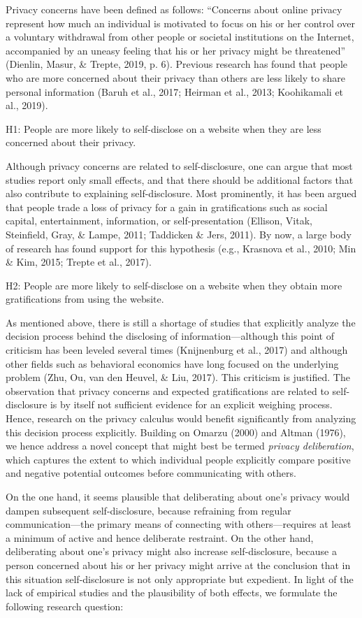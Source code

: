 \documentclass[
  english,
  man,floatsintext]{apa6}
\begin{document}
Privacy concerns have been defined as follows:
\enquote{Concerns about online privacy represent how much an individual is motivated to focus on his or her control over a voluntary withdrawal from other people or societal institutions on the Internet, accompanied by an uneasy feeling that his or her privacy might be threatened} (Dienlin, Masur, \& Trepte, 2019, p. 6).
Previous research has found that people who are more concerned about their privacy than others are less likely to share personal information (Baruh et al., 2017; Heirman et al., 2013; Koohikamali et al., 2019).

H1: People are more likely to self-disclose on a website when they are less concerned about their privacy.

Although privacy concerns are related to self-disclosure, one can argue that most studies report only small effects, and that there should be additional factors that also contribute to explaining self-disclosure.
Most prominently, it has been argued that people trade a loss of privacy for a gain in gratifications such as social capital, entertainment, information, or self-presentation (Ellison, Vitak, Steinfield, Gray, \& Lampe, 2011; Taddicken \& Jers, 2011).
By now, a large body of research has found support for this hypothesis (e.g., Krasnova et al., 2010; Min \& Kim, 2015; Trepte et al., 2017).

H2: People are more likely to self-disclose on a website when they obtain more gratifications from using the website.

As mentioned above, there is still a shortage of studies that explicitly analyze the decision process behind the disclosing of information---although this point of criticism has been leveled several times (Knijnenburg et al., 2017) and although other fields such as behavioral economics have long focused on the underlying problem (Zhu, Ou, van den Heuvel, \& Liu, 2017).
This criticism is justified.
The observation that privacy concerns and expected gratifications are related to self-disclosure is by itself not sufficient evidence for an explicit weighing process.
Hence, research on the privacy calculus would benefit significantly from analyzing this decision process explicitly.
Building on Omarzu (2000) and Altman (1976), we hence address a novel concept that might best be termed \emph{privacy deliberation}, which captures the extent to which individual people explicitly compare positive and negative potential outcomes before communicating with others.

On the one hand, it seems plausible that deliberating about one's privacy would dampen subsequent self-disclosure, because refraining from regular communication---the primary means of connecting with others---requires at least a minimum of active and hence deliberate restraint.
On the other hand, deliberating about one's privacy might also increase self-disclosure, because a person concerned about his or her privacy might arrive at the conclusion that in this situation self-disclosure is not only appropriate but expedient.
In light of the lack of empirical studies and the plausibility of both effects, we formulate the following research question:
\end{document}
